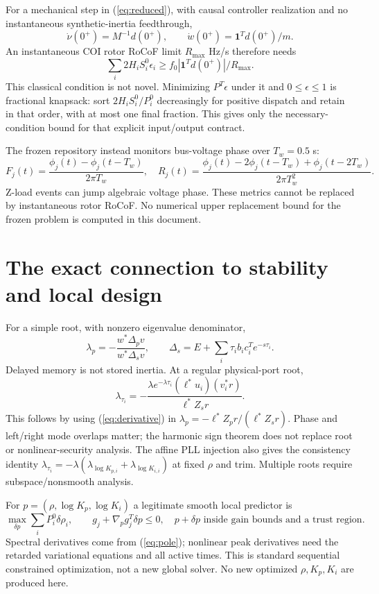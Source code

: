 \documentclass[11pt]{article}
\newcommand{\one}{\mathbf{1}}
\begin{document}
For a mechanical step in (\ref{eq:reduced}), with causal controller
realization and no instantaneous synthetic-inertia feedthrough,
\[
 \dot\nu(0^+)=M^{-1}d(0^+),\qquad
 \dot w(0^+)=\one^Td(0^+)/m .
\]
An instantaneous COI rotor RoCoF limit $R_{\max}$ Hz/s therefore needs
\begin{equation}
 \sum_i2H_iS_i^0\epsilon_i
 \geq f_0|\one^Td(0^+)|/R_{\max}. \label{eq:floor}
\end{equation}
This classical condition is not novel. Minimizing $P^T\epsilon$
under it and $0\leq\epsilon\leq1$ is fractional knapsack: sort
$2H_iS_i^0/P_i^0$ decreasingly for positive dispatch and retain in
that order, with at most one final fraction. This gives only the
necessary-condition bound for that explicit input/output contract.

The frozen repository instead monitors bus-voltage phase over
$T_w=0.5$ s:
\[
 F_j(t)=\frac{\phi_j(t)-\phi_j(t-T_w)}{2\pi T_w},\quad
 R_j(t)=\frac{\phi_j(t)-2\phi_j(t-T_w)+\phi_j(t-2T_w)}{2\pi T_w^2}.
\]
Z-load events can jump algebraic voltage phase.
These metrics cannot be replaced by instantaneous rotor RoCoF.
No numerical upper replacement bound for the frozen problem is
computed in this document.

\section{The exact connection to stability and local design}
For a simple root, with nonzero eigenvalue denominator,
\[
 \lambda_p=-\frac{w^*\Delta_pv}{w^*\Delta_s v},\qquad
 \Delta_s=E+\sum_i\tau_i b_ic_i^T e^{-s\tau_i}.
\]
Delayed memory is not stored inertia. At a regular physical-port root,
\begin{equation}
 \boxed{\lambda_{\tau_i}
 =-\frac{\lambda e^{-\lambda\tau_i}
             (\ell^*u_i)(v_i^*r)}{\ell^*Z_s r}.} \label{eq:pole}
\end{equation}
This follows by using (\ref{eq:derivative}) in
$\lambda_p=-\ell^*Z_pr/(\ell^*Z_sr)$.
Phase and left/right mode overlaps matter; the harmonic sign theorem
does not replace root or nonlinear-security analysis.
The affine PLL injection also gives the consistency identity
$\lambda_{\tau_i}=-\lambda(\lambda_{\log K_{p,i}}+
\lambda_{\log K_{i,i}})$ at fixed $\rho$ and trim.
Multiple roots require subspace/nonsmooth analysis.

For $p=(\rho,\log K_p,\log K_i)$ a legitimate smooth local predictor is
\[
 \max_{\delta p}\sum_iP_i^0\delta\rho_i,\qquad
 g_j+\nabla_p g_j^T\delta p\leq0,
 \quad p+\delta p\text{ inside gain bounds and a trust region}.
\]
Spectral derivatives come from (\ref{eq:pole}); nonlinear peak
derivatives need the retarded variational equations and all active
times. This is standard sequential constrained optimization, not a
new global solver. No new optimized $\rho,K_p,K_i$ are produced here.
\end{document}
